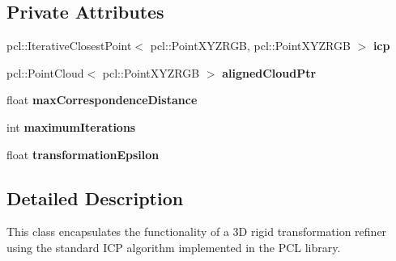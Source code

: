 \subsection*{Private Attributes}
\begin{DoxyCompactItemize}
\item 
\hypertarget{class_i_c_p_pose_refiner___p_c_l_a18dee09c2029e84f6a1e72910c528662}{
pcl::IterativeClosestPoint$<$ pcl::PointXYZRGB, pcl::PointXYZRGB $>$ {\bfseries icp}}
\label{class_i_c_p_pose_refiner___p_c_l_a18dee09c2029e84f6a1e72910c528662}

\item 
\hypertarget{class_i_c_p_pose_refiner___p_c_l_a25d56d3d98d851da532f29215d9c930e}{
pcl::PointCloud$<$ pcl::PointXYZRGB $>$ {\bfseries alignedCloudPtr}}
\label{class_i_c_p_pose_refiner___p_c_l_a25d56d3d98d851da532f29215d9c930e}

\item 
\hypertarget{class_i_c_p_pose_refiner___p_c_l_acab3758cb1d71c76f5868fdef2e53f5a}{
float {\bfseries maxCorrespondenceDistance}}
\label{class_i_c_p_pose_refiner___p_c_l_acab3758cb1d71c76f5868fdef2e53f5a}

\item 
\hypertarget{class_i_c_p_pose_refiner___p_c_l_ac50c9d45d78f75561e8d978f0b297502}{
int {\bfseries maximumIterations}}
\label{class_i_c_p_pose_refiner___p_c_l_ac50c9d45d78f75561e8d978f0b297502}

\item 
\hypertarget{class_i_c_p_pose_refiner___p_c_l_a640d703fc7c39b86287e37b555b1db9b}{
float {\bfseries transformationEpsilon}}
\label{class_i_c_p_pose_refiner___p_c_l_a640d703fc7c39b86287e37b555b1db9b}

\end{DoxyCompactItemize}


\subsection{Detailed Description}
This class encapsulates the functionality of a 3D rigid transformation refiner using the standard ICP algorithm implemented in the PCL library. 

